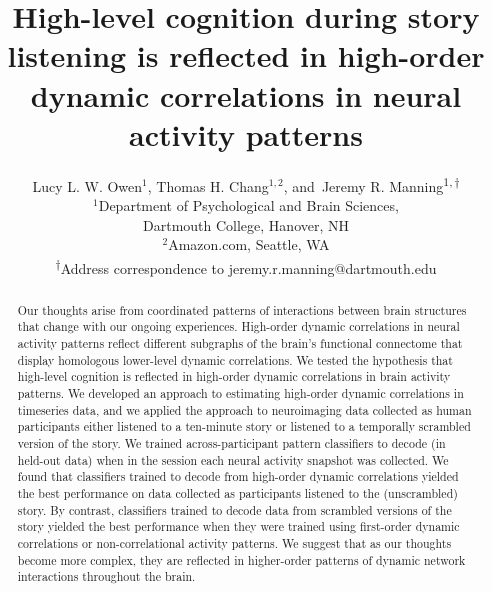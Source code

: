 \documentclass[english]{article}
\title{High-level cognition during story listening is reflected in
  high-order dynamic correlations in neural activity patterns}
\author{Lucy L. W. Owen$^1$, Thomas H. Chang$^{1,2}$, and\
  Jeremy R. Manning\textsuperscript{$1, \dagger$}\\
  [0.1in]$^1$Department of Psychological and Brain
  Sciences,\\Dartmouth
  College, Hanover, NH\\
  $^2$Amazon.com, Seattle, WA\\
  \textsuperscript{$\dagger$}Address correspondence to
  jeremy.r.manning@dartmouth.edu}
\begin{document}
\maketitle


\begin{abstract}
  Our thoughts arise from coordinated patterns of interactions between
  brain structures that change with our ongoing experiences.
  High-order dynamic correlations in neural activity patterns reflect
  different subgraphs of the brain's functional connectome that display
  homologous lower-level dynamic correlations.  We tested the
  hypothesis that high-level cognition is reflected in high-order
  dynamic correlations in brain activity patterns.  We developed an
  approach to estimating high-order dynamic correlations in timeseries
  data, and we applied the approach to neuroimaging data collected as
  human participants either listened to a ten-minute story or listened
  to a temporally scrambled version of the story.  We trained
  across-participant pattern classifiers to decode (in held-out data)
  when in the session each neural activity snapshot was collected.  We
  found that classifiers trained to decode from high-order dynamic
  correlations yielded the best performance on data collected as
  participants listened to the (unscrambled) story.  By contrast,
  classifiers trained to decode data from scrambled versions of the
  story yielded the best performance when they were trained using
  first-order dynamic correlations or non-correlational activity
  patterns.  We suggest that as our thoughts become more complex, they
  are reflected in higher-order patterns of dynamic network
  interactions throughout the brain.
\end{abstract}

\doublespacing
\end{document}
